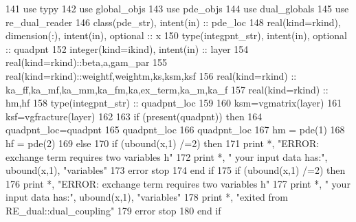 \begin{DoxyCode}
141       \textcolor{keywordtype}{use }typy
142       \textcolor{keywordtype}{use }global_objs
143       \textcolor{keywordtype}{use }pde_objs
144       \textcolor{keywordtype}{use }dual_globals
145       \textcolor{keywordtype}{use }re_dual_reader
146       \textcolor{keywordtype}{class}(pde_str), \textcolor{keywordtype}{intent(in)} :: pde\_loc
148       \textcolor{keywordtype}{real(kind=rkind)}, \textcolor{keywordtype}{dimension(:)}, \textcolor{keywordtype}{intent(in)}, \textcolor{keywordtype}{optional}    :: x
150       \textcolor{keywordtype}{type}(integpnt_str), \textcolor{keywordtype}{intent(in)}, \textcolor{keywordtype}{optional} :: quadpnt
152       \textcolor{keywordtype}{integer(kind=ikind)}, \textcolor{keywordtype}{intent(in)} :: layer
154       \textcolor{keywordtype}{real(kind=rkind)}::beta,a,gam\_par
155       \textcolor{keywordtype}{real(kind=rkind)}::weightf,weightm,ks,ksm,ksf
156       \textcolor{keywordtype}{real}(kind=rkind)                            :: ka\_ff,ka\_mf,ka\_mm,ka\_fm,ka,ex\_term,ka\_m,ka\_f
157       \textcolor{keywordtype}{real}(kind=rkind)                            :: hm,hf
158       \textcolor{keywordtype}{type}(integpnt_str) :: quadpnt\_loc     
159         
160       ksm=vgmatrix(layer)%
161       ksf=vgfracture(layer)%
162             
163       \textcolor{keywordflow}{if} (\textcolor{keyword}{present}(quadpnt)) \textcolor{keywordflow}{then}
164         quadpnt\_loc=quadpnt
165         quadpnt\_loc%
166         quadpnt\_loc%
167         hm = pde(1)%
168         hf = pde(2)%
169       \textcolor{keywordflow}{else}
170             \textcolor{keywordflow}{if} (ubound(x,1) /=2) \textcolor{keywordflow}{then}
171               print *, \textcolor{stringliteral}{"ERROR: exchange term requires two variables h"}
172               print *, \textcolor{stringliteral}{"       your input data has:"}, ubound(x,1), \textcolor{stringliteral}{"variables"}
173               error stop
174 \textcolor{keywordflow}{            end if}
175         \textcolor{keywordflow}{if} (ubound(x,1) /=2) \textcolor{keywordflow}{then}
176               print *, \textcolor{stringliteral}{"ERROR: exchange term requires two variables h"}
177               print *, \textcolor{stringliteral}{"       your input data has:"}, ubound(x,1), \textcolor{stringliteral}{"variables"}
178               print *, \textcolor{stringliteral}{"exited from RE\_dual::dual\_coupling"}
179               error stop
180 \textcolor{keywordflow}{           end if}

\end{DoxyCode}
